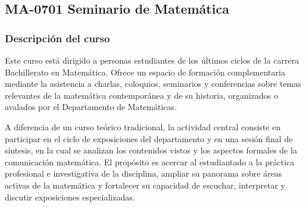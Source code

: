 \newpage
\subsection*{MA-0701 Seminario de Matemática}

\hypertarget{MA0701}{}
\begin{refsection}
\begin{table}[H]
\end{table}

\subsubsection*{Descripción del curso}

Este curso está dirigido a personas estudiantes de los últimos ciclos de la carrera Bachillerato en Matemática. Ofrece un espacio de formación complementaria mediante la asistencia a charlas, coloquios, seminarios y conferencias sobre temas relevantes de la matemática contemporánea y de su historia, organizados o avalados por el Departamento de Matemáticas.

A diferencia de un curso teórico tradicional, la actividad central consiste en participar en el ciclo de exposiciones del departamento y en una sesión final de síntesis, en la cual se analizan los contenidos vistos y los aspectos formales de la comunicación matemática. El propósito es acercar al estudiantado a la práctica profesional e investigativa de la disciplina, ampliar su panorama sobre áreas activas de la matemática y fortalecer su capacidad de escuchar, interpretar y discutir exposiciones especializadas.


\end{refsection}
